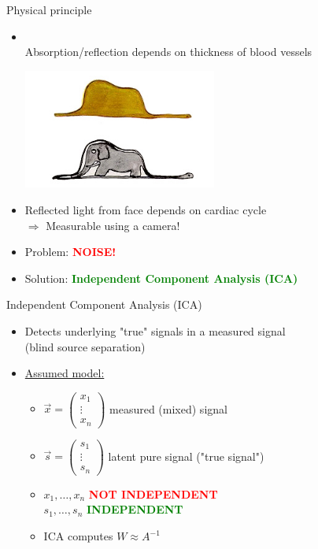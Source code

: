 \documentclass{beamer}
\begin{document}
\begin{frame}{Physical principle}
	\begin{itemize}
		\item {}\\
			Absorption/reflection depends on thickness of blood vessels\\
			\begin{center}
				\includegraphics[width=0.5\textwidth]{snake.jpg}
			\end{center} \pause
		\item Reflected light from face depends on cardiac cycle \\ \pause
			$\Rightarrow$ Measurable using a camera! \pause
		\item Problem: \textbf{\textcolor{red}{NOISE!}} \pause
		\item Solution: \textbf{\textcolor{green}{Independent Component Analysis (ICA)}}
	\end{itemize}
\end{frame}

\begin{frame}{Independent Component Analysis (ICA)}
	\begin{itemize}
		\item Detects underlying "true" signals in a measured signal\\
			(blind source separation) \pause
		\item \underline{Assumed model:}
			\begin{center}
			\end{center} \pause
			\begin{itemize}
				\item $\vec{x} = \begin{pmatrix}
					x_1 \\
					\vdots \\
					x_n
				\end{pmatrix}$ measured (mixed) signal \pause
				\item $\vec{s} = \begin{pmatrix}
					s_1 \\
					\vdots \\
					s_n
				\end{pmatrix}$ latent pure signal ("true signal") \pause
				\item $x_1, \dots, x_n$ \textbf{\textcolor{red}{NOT INDEPENDENT}}\\
					$s_1, \dots, s_n$ \textbf{\textcolor{green}{INDEPENDENT}} \pause
				\item ICA computes $W \approx A^{-1}$
			\end{itemize}
	\end{itemize}
\end{frame}
\end{document}
